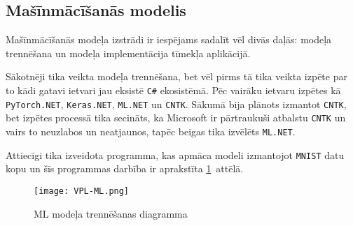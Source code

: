 \subsection{Mašīnmācīšanās modelis}

    Mašīnmācīšanās modeļa izstrādi ir iespējams sadalīt vēl divās daļās: modeļa trennēšana un modeļa
    implementācija tīmekļa aplikācijā.

    Sākotnēji tika veikta modeļa trennēšana, bet vēl pirms tā tika veikta izpēte par to kādi gatavi
    ietvari jau eksistē \texttt{C\#} ekosistēmā. Pēc vairāku ietvaru izpētes kā \texttt{PyTorch.NET},
    \texttt{Keras.NET}, \texttt{ML.NET} un \texttt{CNTK}. Sākumā bija plānots izmantot \texttt{CNTK},
    bet izpētes processā tika secināts, ka Microsoft ir pārtraukuši atbalstu \texttt{CNTK} un vairs
    to neuzlabos un neatjaunos, tapēc beigas tika izvēlēts \texttt{ML.NET}.

    Attiecīgi tika izveidota programma, kas apmāca modeli izmantojot \texttt{MNIST} datu kopu un
    šīs programmas darbība ir aprakstīta \ref{ml:train}~attēlā.

    \begin{figure}[H]
        \centering
        \texttt{[image: VPL-ML.png]}
        \caption{ML modeļa trennēšanas diagramma}
        \label{ml:train}
    \end{figure}
